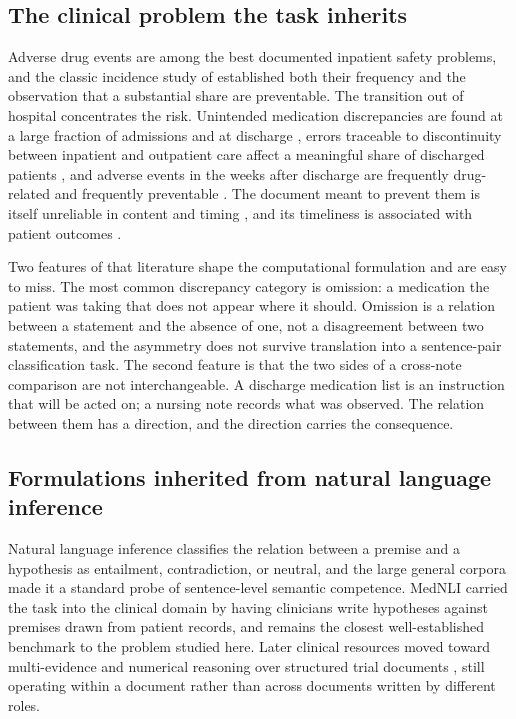 \subsection{The clinical problem the task inherits}

Adverse drug events are among the best documented inpatient safety problems, and the classic
incidence study of \citet{bates1995ade} established both their frequency and the observation
that a substantial share are preventable. The transition out of hospital concentrates the
risk. Unintended medication discrepancies are found at a large fraction of admissions
\citep{cornish2005discrepancies} and at discharge \citep{wong2008reconciliation}, errors
traceable to discontinuity between inpatient and outpatient care affect a meaningful share of
discharged patients \citep{moore2003discontinuity}, and adverse events in the weeks after
discharge are frequently drug-related and frequently preventable \citep{forster2003adverse}.
The document meant to prevent them is itself unreliable in content and timing
\citep{kripalani2007deficits}, and its timeliness is associated with patient outcomes
\citep{li2013timeliness}.

Two features of that literature shape the computational formulation and are easy to miss.
The most common discrepancy category is omission: a medication the patient was taking that
does not appear where it should. Omission is a relation between a statement and the absence
of one, not a disagreement between two statements, and the asymmetry does not survive
translation into a sentence-pair classification task. The second feature is that the two
sides of a cross-note comparison are not interchangeable. A discharge medication list is an
instruction that will be acted on; a nursing note records what was observed. The relation
between them has a direction, and the direction carries the consequence.

\subsection{Formulations inherited from natural language inference}

Natural language inference classifies the relation between a premise and a hypothesis as
entailment, contradiction, or neutral, and the large general corpora
\citep{bowman2015snli,williams2018mnli} made it a standard probe of sentence-level semantic
competence. MedNLI \citep{romanov2018mednli} carried the task into the clinical domain by
having clinicians write hypotheses against premises drawn from patient records, and remains
the closest well-established benchmark to the problem studied here. Later clinical resources
moved toward multi-evidence and numerical reasoning over structured trial documents
\citep{jullien2023nli4ct}, still operating within a document rather than across documents
written by different roles.

